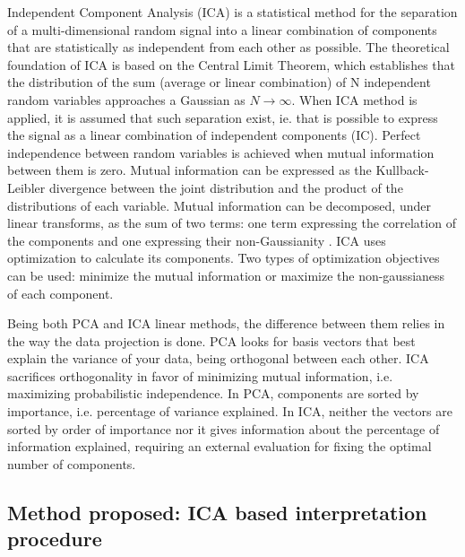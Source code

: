 \documentclass[review]{elsarticle}
\theoremstyle{definition} %
\theoremstyle{remark}
\begin{document}
Independent Component Analysis (ICA)\cite{hyvarinen2000independent} is a statistical method for the separation of a multi-dimensional random signal into a linear combination of components that are statistically as independent from each other as possible. The theoretical foundation of ICA is based on the Central Limit Theorem, which establishes that the distribution of the sum (average or linear combination) of N independent random variables approaches a Gaussian as $N \rightarrow \infty$. When ICA method is applied, it is assumed that such separation exist, ie. that is possible to express the signal as a linear combination of independent components (IC). Perfect independence between random variables is achieved when mutual information between them is zero. Mutual information can be expressed as the Kullback-Leibler divergence between the joint distribution and the product of the distributions of each variable. Mutual information can be decomposed, under linear transforms, as the sum of two terms: one term expressing the correlation of the components and one expressing their non-Gaussianity \cite{cardoso2003dependence}. ICA uses optimization to calculate its components. Two types of optimization objectives can be used: minimize the mutual information or maximize the non-gaussianess of each component. 

Being both PCA and ICA linear methods, the difference between them relies in the way the data projection is done. PCA looks for basis vectors that best explain the variance of your data, being orthogonal between each other. ICA sacrifices orthogonality in favor of minimizing mutual information, i.e. maximizing probabilistic independence. In PCA, components are sorted by importance, i.e. percentage of variance explained. In ICA, neither the vectors are sorted by order of importance nor it gives information about the percentage of information explained, requiring an external evaluation for fixing the optimal number of components.



\subsection{Method proposed: ICA based interpretation procedure}\label{ICAmethod}
\end{document}
